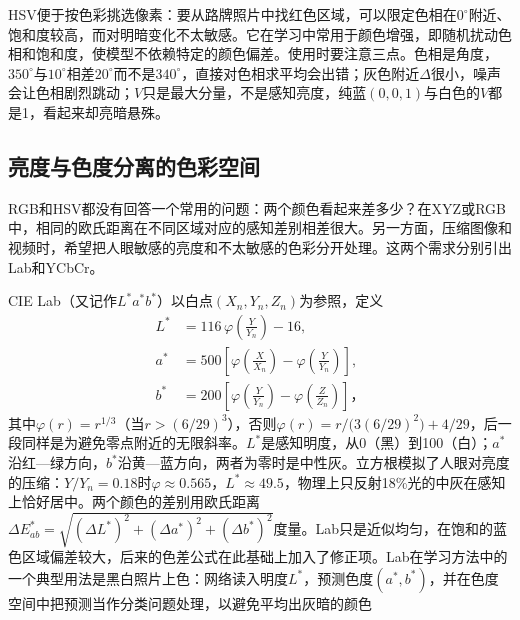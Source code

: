 HSV便于按色彩挑选像素：要从路牌照片中找红色区域，可以限定色相在$0^\circ$附近、饱和度较高，而对明暗变化不太敏感。它在学习中常用于颜色增强，即随机扰动色相和饱和度，使模型不依赖特定的颜色偏差。使用时要注意三点。色相是角度，$350^\circ$与$10^\circ$相差$20^\circ$而不是$340^\circ$，直接对色相求平均会出错；灰色附近$\Delta$很小，噪声会让色相剧烈跳动；$V$只是最大分量，不是感知亮度，纯蓝$(0,0,1)$与白色的$V$都是1，看起来却亮暗悬殊。

\subsection{亮度与色度分离的色彩空间}
\label{sec:vision-formation-luma-chroma}

RGB和HSV都没有回答一个常用的问题：两个颜色看起来差多少？在XYZ或RGB中，相同的欧氏距离在不同区域对应的感知差别相差很大。另一方面，压缩图像和视频时，希望把人眼敏感的亮度和不太敏感的色彩分开处理。这两个需求分别引出Lab和YCbCr。

CIE Lab（又记作$L^*a^*b^*$）以白点$(X_n,Y_n,Z_n)$为参照，定义
\begin{equation}
  \begin{aligned}
    L^*&=116\,\varphi\!\left(\tfrac{Y}{Y_n}\right)-16,\\
    a^*&=500\left[\varphi\!\left(\tfrac{X}{X_n}\right)-\varphi\!\left(\tfrac{Y}{Y_n}\right)\right],\\
    b^*&=200\left[\varphi\!\left(\tfrac{Y}{Y_n}\right)-\varphi\!\left(\tfrac{Z}{Z_n}\right)\right]\text{，}
  \end{aligned}
  \label{eq:vision-formation-lab}
\end{equation}
其中$\varphi(r)=r^{1/3}$（当$r>(6/29)^3$），否则$\varphi(r)=r/\bigl(3(6/29)^2\bigr)+4/29$，后一段同样是为避免零点附近的无限斜率。$L^*$是感知明度，从0（黑）到100（白）；$a^*$沿红—绿方向，$b^*$沿黄—蓝方向，两者为零时是中性灰。立方根模拟了人眼对亮度的压缩：$Y/Y_n=0.18$时$\varphi\approx0.565$，$L^*\approx49.5$，物理上只反射18\%光的中灰在感知上恰好居中。两个颜色的差别用欧氏距离$\Delta E^*_{ab}=\sqrt{(\Delta L^*)^2+(\Delta a^*)^2+(\Delta b^*)^2}$度量。Lab只是近似均匀，在饱和的蓝色区域偏差较大，后来的色差公式在此基础上加入了修正项。Lab在学习方法中的一个典型用法是黑白照片上色：网络读入明度$L^*$，预测色度$(a^*,b^*)$，并在色度空间中把预测当作分类问题处理，以避免平均出灰暗的颜色

